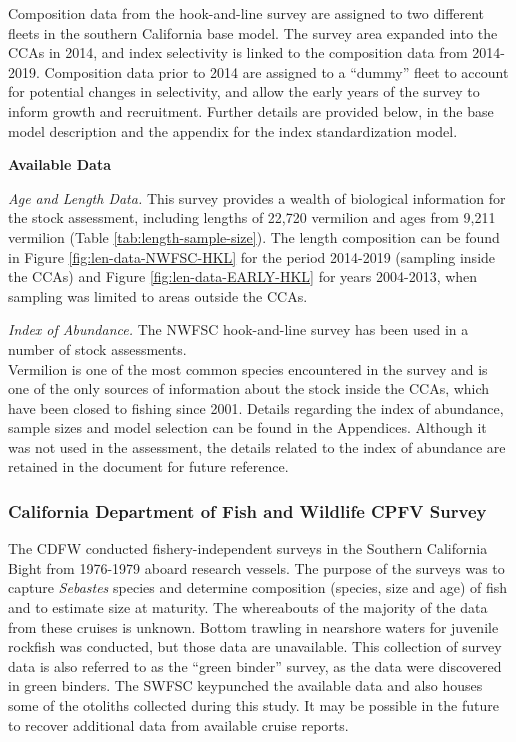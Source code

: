\documentclass[11pt,
  english,
]{article}
\begin{document}
Composition data from the hook-and-line survey are assigned to two different fleets in the southern California base model. The survey area expanded into the CCAs in 2014, and index selectivity is linked to the composition data from 2014-2019. Composition data prior to 2014 are assigned to a ``dummy'' fleet to account for potential changes in selectivity, and allow the early years of the survey to inform growth and recruitment. Further details are provided below, in the base model description and the appendix for the index standardization model.

\textbf{Available Data}

\emph{Age and Length Data.} This survey provides a wealth of biological information for the stock assessment, including lengths of 22,720 vermilion and ages from 9,211 vermilion (Table \ref{tab:length-sample-size}). The length composition can be found in Figure \ref{fig:len-data-NWFSC-HKL} for the period 2014-2019 (sampling inside the CCAs) and Figure \ref{fig:len-data-EARLY-HKL} for years 2004-2013, when sampling was limited to areas outside the CCAs.

\emph{Index of Abundance.} The NWFSC hook-and-line survey has been used in a number of stock assessments.\\
Vermilion is one of the most common species encountered in the survey and is one of the only sources of information about the stock inside the CCAs, which have been closed to fishing since 2001. Details regarding the index of abundance, sample sizes and model selection can be found in the Appendices. Although it was not used in the assessment, the details related to the index of abundance are retained in the document for future reference.


\hypertarget{california-department-of-fish-and-wildlife-cpfv-survey}{%
\subsubsection{California Department of Fish and Wildlife CPFV Survey}\label{california-department-of-fish-and-wildlife-cpfv-survey}}

\leavevmode\tagmcend\tagstructend

The CDFW conducted fishery-independent surveys in the Southern California Bight from 1976-1979 aboard research vessels. The purpose of the surveys was to capture \emph{Sebastes} species and determine composition (species, size and age) of fish and to estimate size at maturity. The whereabouts of the majority of the data from these cruises is unknown. Bottom trawling in nearshore waters for juvenile rockfish was conducted, but those data are unavailable. This collection of survey data is also referred to as the ``green binder'' survey, as the data were discovered in green binders. The SWFSC keypunched the available data and also houses some of the otoliths collected during this study. It may be possible in the future to recover additional data from available cruise reports.
\end{document}
